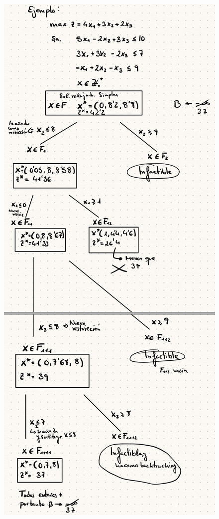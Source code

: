 \documentclass[12pt, twoside, openright]{report} %
\begin{document}
	\begin{figure}[H]
		{\includegraphics[scale=.32]{Untitled 20.png}}
	\end{figure}
\end{document}
